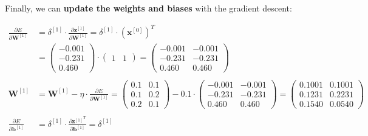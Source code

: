 \documentclass[12pt]{article}
\begin{document}
\begin{enumerate}
\vspace{20pt}
Finally, we can \textbf{update the weights and biases} with the gradient descent:

\begin{equation*}
    \begin{aligned}
        \frac{\partial E}{\partial \mathbf{W}^{[1]}} &= \delta^{[1]} \cdot \frac{\partial \mathbf{z}^{[1]}}{\partial \mathbf{W}^{[1]}} = \delta^{[1]} \cdot \left(\mathbf{x}^{[0]}\right)^T \\
        &= \begin{pmatrix}
            -0.001\\
            -0.231\\
            0.460
        \end{pmatrix} \cdot \begin{pmatrix}
            1 & 1 
        \end{pmatrix} = \begin{pmatrix}
            -0.001 & -0.001\\
            -0.231 & -0.231\\
            0.460 & 0.460
        \end{pmatrix}\\
        \\
        \mathbf{W}^{[1]} &= \mathbf{W}^{[1]} - \eta \cdot \frac{\partial E}{\partial \mathbf{W}^{[1]}} = \begin{pmatrix}
            0.1 & 0.1\\
            0.1 & 0.2\\
            0.2 & 0.1
        \end{pmatrix} - 0.1 \cdot \begin{pmatrix}
            -0.001 & -0.001\\
            -0.231 & -0.231\\
            0.460 & 0.460
        \end{pmatrix} = \begin{pmatrix}
            0.1001 & 0.1001\\
            0.1231 & 0.2231\\
            0.1540 & 0.0540
        \end{pmatrix}\\
        \\
        \frac{\partial E}{\partial \mathbf{b}^{[1]}}&= \delta^{[1]} \cdot \frac{{\partial \mathbf{z}^{[1]}}^T}{\partial \mathbf{b}^{[1]}} = \delta^{[1]}\\
        \\

\end{aligned}
\end{equation*}
\end{enumerate}
\end{document}
